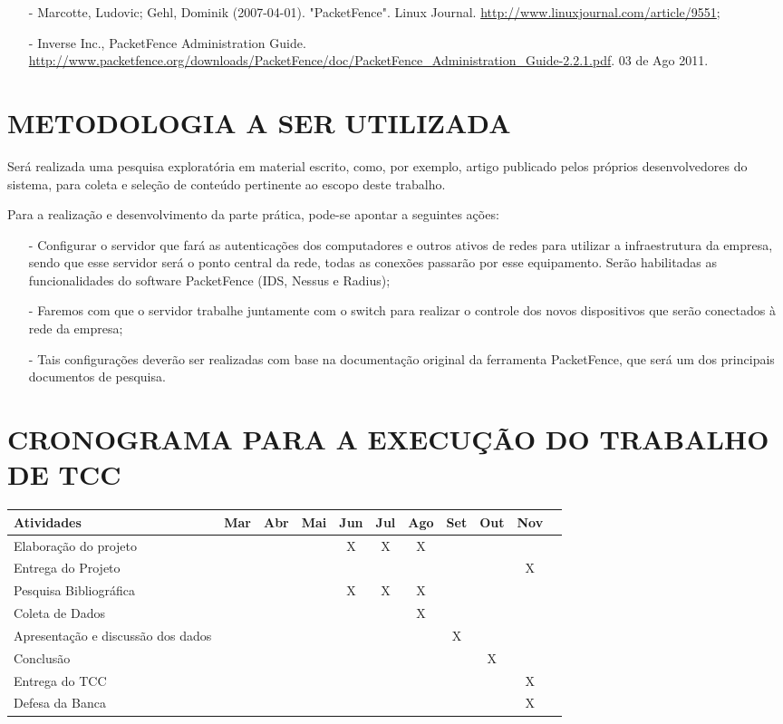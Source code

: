 \documentclass[brazil, ruledheader, pnumromarab,normaltoc]{abnt}
\begin{document}
\begin{enumerate}
\item[-]Marcotte, Ludovic; Gehl, Dominik (2007-04-01). "PacketFence". Linux Journal. \url{http://www.linuxjournal.com/article/9551};
\item[-]Inverse Inc., PacketFence Administration Guide. \url{http://www.packetfence.org/downloads/PacketFence/doc/PacketFence_Administration_Guide-2.2.1.pdf}. 03 de Ago 2011.
\end{enumerate}

\chapter{METODOLOGIA A SER UTILIZADA}
Será realizada uma pesquisa exploratória em material escrito, como, por exemplo, artigo publicado pelos próprios desenvolvedores do sistema, para coleta e seleção de conteúdo pertinente ao escopo deste trabalho.
\par
Para a realização e desenvolvimento da parte prática, pode-se apontar a seguintes ações:
\begin{enumerate}
\item[-]{Configurar o servidor que fará as autenticações dos computadores e outros ativos de redes para utilizar a infraestrutura da empresa, sendo que esse servidor será o ponto central da rede, todas as conexões passarão por esse equipamento. Serão habilitadas as funcionalidades do software PacketFence (IDS, Nessus e Radius);}
\item[-]{Faremos com que o servidor trabalhe juntamente com o switch para realizar o controle dos novos dispositivos que serão conectados à rede da empresa;}
\item[-]{Tais configurações deverão ser realizadas com base na documentação original da ferramenta PacketFence, que será um dos principais documentos de pesquisa.}
\end{enumerate}

\chapter{CRONOGRAMA PARA A EXECUÇÃO DO TRABALHO DE TCC}
\begin{tabular}{|p{4cm}|c|c|c|c|c|c|c|c|c|c|}
\hline
\textbf{Atividades}&		\textbf{Mar}&	\textbf{Abr}&		\textbf{Mai}&		\textbf{Jun}&		\textbf{Jul}&		\textbf{Ago}&	\textbf{Set}&		\textbf{Out}&	\textbf{Nov}\\
\hline
Elaboração do projeto&	&	&	&	X&	X&	X&	&	&	\\
\hline
Entrega do Projeto&		&	&	&	&	&	&	&	&	X\\
\hline
Pesquisa Bibliográfica&	&	&	&	X&	X&	X&	&		&\\
\hline
Coleta de Dados&		&	&	&	&	&	X&	&		&\\
\hline
Apresentação e discussão dos dados&	&	&	&	&	&	&	X&	&\\
\hline
Conclusão&	&	&	&	&	&	&	&	X&	\\
\hline
Entrega do TCC&	&	&	&	&	&	&	&	&	X\\
\hline
Defesa da Banca&	&	&	&	&	&	&	&	&	X\\
\hline
\end{tabular}
\end{document}
